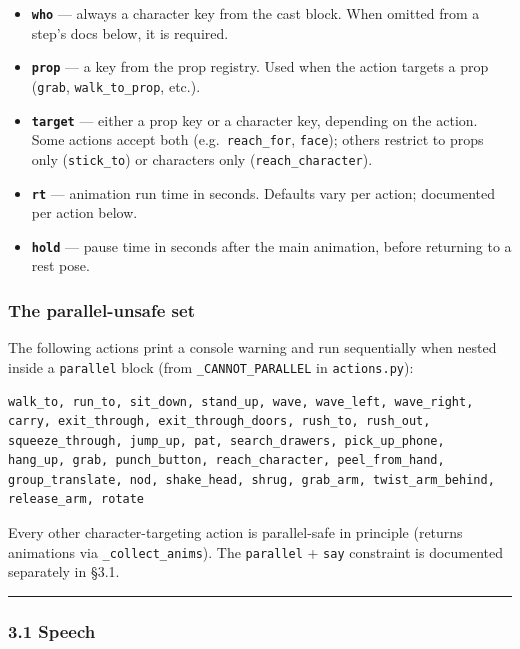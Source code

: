 \documentclass[
  11pt,
]{book}
\providecommand{\tightlist}{%
  \setlength{\itemsep}{0pt}\setlength{\parskip}{0pt}}
\begin{document}
\begin{itemize}
\tightlist
\item
  \textbf{\texttt{who}} --- always a character key from the cast block.
  When omitted from a step's docs below, it is required.
\item
  \textbf{\texttt{prop}} --- a key from the prop registry. Used when the
  action targets a prop (\texttt{grab}, \texttt{walk\_to\_prop}, etc.).
\item
  \textbf{\texttt{target}} --- either a prop key or a character key,
  depending on the action. Some actions accept both
  (e.g.~\texttt{reach\_for}, \texttt{face}); others restrict to props
  only (\texttt{stick\_to}) or characters only
  (\texttt{reach\_character}).
\item
  \textbf{\texttt{rt}} --- animation run time in seconds. Defaults vary
  per action; documented per action below.
\item
  \textbf{\texttt{hold}} --- pause time in seconds after the main
  animation, before returning to a rest pose.
\end{itemize}

\subsubsection{The parallel-unsafe set}\label{the-parallel-unsafe-set}

The following actions print a console warning and run sequentially when
nested inside a \texttt{parallel} block (from
\texttt{\_CANNOT\_PARALLEL} in \texttt{actions.py}):

\begin{verbatim}
walk_to, run_to, sit_down, stand_up, wave, wave_left, wave_right,
carry, exit_through, exit_through_doors, rush_to, rush_out,
squeeze_through, jump_up, pat, search_drawers, pick_up_phone,
hang_up, grab, punch_button, reach_character, peel_from_hand,
group_translate, nod, shake_head, shrug, grab_arm, twist_arm_behind,
release_arm, rotate
\end{verbatim}

Every other character-targeting action is parallel-safe in principle
(returns animations via \texttt{\_collect\_anims}). The
\texttt{parallel} + \texttt{say} constraint is documented separately in
§3.1.

\begin{center}\rule{0.5\linewidth}{0.5pt}\end{center}

\subsubsection{3.1 Speech}\label{speech}
\end{document}
